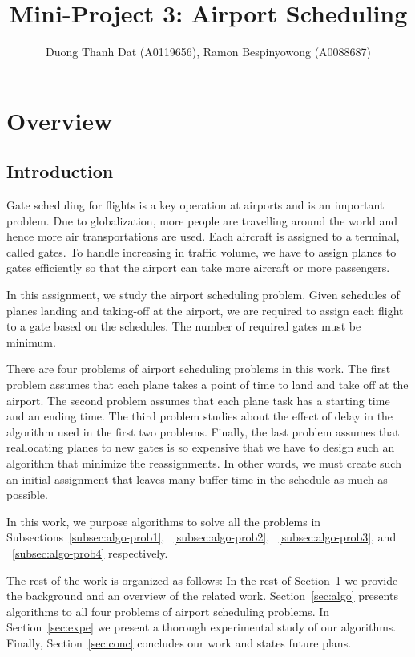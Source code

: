 \documentclass[11pt,a4paper]{article}
\author{Duong Thanh Dat (A0119656), Ramon Bespinyowong (A0088687)}
\title{Mini-Project 3: Airport Scheduling}
\begin{document}
\maketitle



\section{Overview}
\label{sec:over}

\subsection{Introduction}
\label{subesc:over-intr}
Gate scheduling for flights is a key operation at airports and is an important problem. Due to globalization, more people are travelling around the world and hence more air transportations are used. Each aircraft is assigned to a terminal, called gates. To handle increasing in traffic volume, we have to assign planes to gates efficiently so that the airport can take more aircraft or more passengers. \par
In this assignment, we study the airport scheduling problem. Given schedules of planes landing and taking-off at the airport, we are required to assign each flight to a gate based on the schedules. The number of required gates must be minimum. \par
There are four problems of airport scheduling problems in this work. The first problem assumes that each plane takes a point of time to land and take off at the airport. The second problem assumes that each plane task has a starting time and an ending time. The third problem studies about the effect of delay in the algorithm used in the first two problems. Finally, the last problem assumes that reallocating planes to new gates is so expensive that we have to design such an algorithm that minimize the reassignments. In other words, we must create such an initial assignment that leaves many buffer time in the schedule as much as possible.  \par
In this work, we purpose algorithms to solve all the problems in Subsections~\ref{subsec:algo-prob1}, ~\ref{subsec:algo-prob2}, ~\ref{subsec:algo-prob3}, and ~\ref{subsec:algo-prob4} respectively. \par
The rest of the work is organized as follows: In the rest of Section~\ref{sec:over} we provide the background and an overview of the related work. Section~\ref{sec:algo} presents algorithms to all four problems of airport scheduling problems. In Section~\ref{sec:expe} we present a thorough experimental study of our algorithms. Finally, Section~\ref{sec:conc} concludes our work and states future plans. \par
\end{document}
